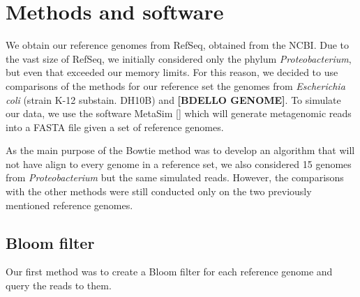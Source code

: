 \documentclass[12pt]{article} %
\begin{document}
\section{Methods and software}
We obtain our reference genomes from RefSeq, obtained from the NCBI. Due to the vast size of RefSeq, we initially considered only the phylum \emph{Proteobacterium}, but even that exceeded our memory limits. For this reason, we decided to use comparisons of the methods for our reference set the genomes from \emph{Escherichia coli} (strain K-12 substain. DH10B) and  {\bf[BDELLO GENOME]}. To simulate our data, we use the software MetaSim [\cite{Richter:2008dg}] which will generate metagenomic reads into a FASTA file given a set of reference genomes.
\par
As the main purpose of the Bowtie method was to develop an algorithm that will not have align to every genome in a reference set, we also considered 15 genomes from \emph{Proteobacterium} but the same simulated reads. However, the comparisons with the other methods were still conducted only on the two previously mentioned reference genomes.
\subsection{Bloom filter}
Our first method was to create a Bloom filter for each reference genome and query the reads to them. 
\end{document}
